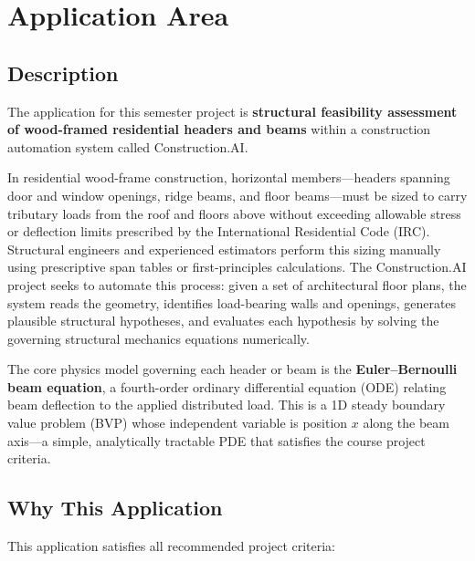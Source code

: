 
\section{Application Area}

\subsection{Description}

The application for this semester project is \textbf{structural feasibility assessment of wood-framed residential headers and beams} within a construction automation system called Construction.AI.

In residential wood-frame construction, horizontal members---headers spanning door and window openings, ridge beams, and floor beams---must be sized to carry tributary loads from the roof and floors above without exceeding allowable stress or deflection limits prescribed by the International Residential Code (IRC).
Structural engineers and experienced estimators perform this sizing manually using prescriptive span tables or first-principles calculations.
The Construction.AI project seeks to automate this process: given a set of architectural floor plans, the system reads the geometry, identifies load-bearing walls and openings, generates plausible structural hypotheses, and evaluates each hypothesis by solving the governing structural mechanics equations numerically.

The core physics model governing each header or beam is the \textbf{Euler--Bernoulli beam equation}, a fourth-order ordinary differential equation (ODE) relating beam deflection to the applied distributed load.
This is a 1D steady boundary value problem (BVP) whose independent variable is position $x$ along the beam axis---a simple, analytically tractable PDE that satisfies the course project criteria.

\subsection{Why This Application}

This application satisfies all recommended project criteria:

